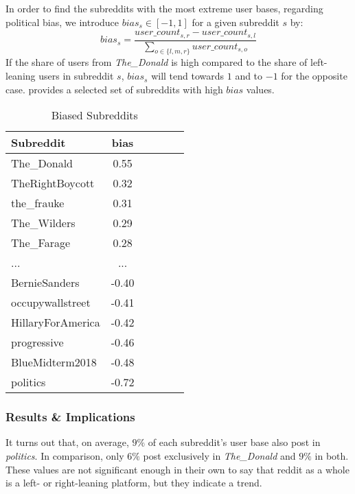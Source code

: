 \documentclass[runningheads,a4paper]{llncs}
\begin{document}
	In order to find the subreddits with the most extreme user bases, regarding political bias, we introduce $bias_s \in [-1,1]$ for a given subreddit $s$ by:
	$$bias_s = \frac{user\_count_{s,r} - user\_count_{s,l}}{\sum_{o \in \{l,m,r\}} user\_count_{s,o}}$$
	If the share of users from \textit{The\_Donald} is high compared to the share of left-leaning users in subreddit $s$, $bias_s$ will tend towards $1$ and to $-1$ for the opposite case.  provides a selected set of subreddits with high $bias$ values.
	\begin{table}
		\caption{Biased Subreddits}
		\centering
		\setlength{\tabcolsep}{5px}
		\begin{tabular}{lccccc}
			\hline\hline
			Subreddit  & bias  \\
			\hline
			The\_Donald     & 0.55 \\
			TheRightBoycott & 0.32 \\
			the\_frauke      & 0.31 \\
			The\_Wilders     & 0.29 \\
			The\_Farage      & 0.28 \\
			...             & ... \\
			BernieSanders     & -0.40 \\
			occupywallstreet  & -0.41 \\
			HillaryForAmerica & -0.42 \\
			progressive       & -0.46 \\
			BlueMidterm2018   & -0.48 \\
			politics          & -0.72 \\
			\hline\hline
		\end{tabular}
		\label{table:biased_subreddits}
	\end{table}
	\subsubsection{Results \& Implications}
	It turns out that, on average, $9\%$ of each subreddit's user base also post in \textit{politics}. In comparison, only $6\%$ post exclusively in \textit{The\_Donald} and $9\%$ in both. These values are not significant enough  in their own to say that reddit as a whole is a left- or right-leaning platform, but they indicate a trend.
	
\end{document}
